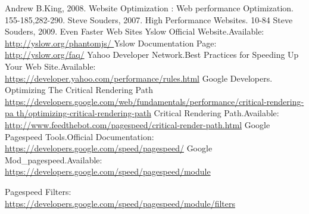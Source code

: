 \documentclass[conference]{IEEEtran}
\begin{document}
\begin{thebibliography}{1}
Andrew B.King, 2008. Website Optimization : Web performance
Optimization. 155-185,282-290.
Steve Souders, 2007.  High Performance Websites. 10-84
Steve Souders, 2009. Even Faster Web Sites 
Yslow Official Website.Available:\\
\href{http://yslow.org/phantomjs/}{http://yslow.org/phantomjs/
}
Yslow Documentation Page:\\
\href{http://yslow.org/faq/}{http://yslow.org/faq/}
Yahoo Developer Network.Best Practices for Speeding Up Your Web
Site.Available:\\
\href{https://developer.yahoo.com/performance/rules.html}{
https://developer.yahoo.com/performance/rules.html}
Google Developers. Optimizing The Critical Rendering
Path\\
\href{
https://developers.google.com/web/fundamentals/performance/critical-rendering-pa
th/optimizing-critical-rendering-path}{
https://developers.google.com/web/fundamentals/performance/critical-rendering-pa
th/optimizing-critical-rendering-path}
Critical Rendering Path.Available:\\
\href{
http://www.feedthebot.com/pagespeed/critical-render-path.html}{
http://www.feedthebot.com/pagespeed/critical-render-path.html}
Google Pagespeed Tools.Official Documentation:\\
\href{https://developers.google.com/speed/pagespeed/}{
https://developers.google.com/speed/pagespeed/}
Google Mod\_pagespeed.Available:\\
\href{
https://developers.google.com/speed/pagespeed/module}{
https://developers.google.com/speed/pagespeed/module}
 
Pagespeed Filters:\\
\href{https://developers.google.com/speed/pagespeed/module/filters}
{https://developers.google.com/speed/pagespeed/module/filters}

\end{thebibliography}
\appendices
\end{document}
